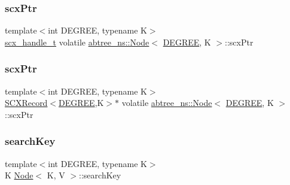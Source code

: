 \subsubsection{\texorpdfstring{scx\+Ptr}{scxPtr}\hspace{0.1cm}{\footnotesize\ttfamily [1/2]}}
{\footnotesize\ttfamily template$<$int D\+E\+G\+R\+EE, typename K$>$ \\
\hyperlink{scx__provider_8h_a368fa55a4b553010913289d3cbe6ce22}{scx\+\_\+handle\+\_\+t} volatile \hyperlink{structabtree__ns_1_1Node}{abtree\+\_\+ns\+::\+Node}$<$ \hyperlink{brown__sigouin__abtree__kcas_2adapter_8h_a5d88b17d70c985f2f2b8e987037fd6dd}{D\+E\+G\+R\+EE}, K $>$\+::scx\+Ptr}

\mbox{\label{structabtree__ns_1_1Node_ab87fb71024cde735cae0a2fbddf5190d}} 
\subsubsection{\texorpdfstring{scx\+Ptr}{scxPtr}\hspace{0.1cm}{\footnotesize\ttfamily [2/2]}}
{\footnotesize\ttfamily template$<$int D\+E\+G\+R\+EE, typename K$>$ \\
\hyperlink{structabtree__ns_1_1SCXRecord}{S\+C\+X\+Record}$<$\hyperlink{brown__sigouin__abtree__kcas_2adapter_8h_a5d88b17d70c985f2f2b8e987037fd6dd}{D\+E\+G\+R\+EE},K$>$$\ast$ volatile \hyperlink{structabtree__ns_1_1Node}{abtree\+\_\+ns\+::\+Node}$<$ \hyperlink{brown__sigouin__abtree__kcas_2adapter_8h_a5d88b17d70c985f2f2b8e987037fd6dd}{D\+E\+G\+R\+EE}, K $>$\+::scx\+Ptr}

\mbox{\label{structabtree__ns_1_1Node_a8723eee7563acc9b8b9cef9b43ca50ea}} 
\subsubsection{\texorpdfstring{search\+Key}{searchKey}}
{\footnotesize\ttfamily template$<$int D\+E\+G\+R\+EE, typename K$>$ \\
K \hyperlink{structabtree__ns_1_1Node}{Node}$<$ K, V $>$\+::search\+Key}

